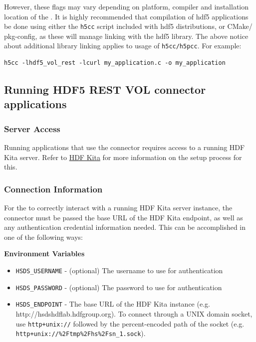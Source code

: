 \documentclass[../users_guide.tex]{subfiles}
\begin{document}
However, these flags may vary depending on platform, compiler and installation
location of the \rvc{}. It is highly recommended that compilation
of \acrshort{hdf5} \rvc{} applications be done using either the
\texttt{h5cc} script included with \acrshort{hdf5} distributions, or CMake/
pkg-config, as these will manage linking with the \acrshort{hdf5} library.
The above notice about additional library linking applies to usage of
\texttt{h5cc/h5pcc}. For example:
\begin{verbatim}
h5cc -lhdf5_vol_rest -lcurl my_application.c -o my_application
\end{verbatim}

\subsection{Running HDF5 REST VOL connector applications}
\label{running_rest_vol_apps}

\subsubsection{Server Access}

Running applications that use the \rvc{} connector requires access to a running HDF Kita
server. Refer to \href{https://www.hdfgroup.org/hdf-kita}{HDF Kita} for more information on
the setup process for this.

\subsubsection{Connection Information}

For the \rvc{} to correctly interact with a running HDF Kita server instance, the connector
must be passed the base URL of the HDF Kita endpoint, as well as any authentication credential
information needed. This can be accomplished in one of the following ways:

\textbf{Environment Variables}

\begin{itemize}
  \item \texttt{HSDS\_USERNAME} - (optional) The username to use for authentication
  \item \texttt{HSDS\_PASSWORD} - (optional) The password to use for authentication
  \item \texttt{HSDS\_ENDPOINT} - The base URL of the HDF Kita instance (e.g. http://hsdshdflab.hdfgroup.org).
    To connect through a UNIX domain socket, use \texttt{http+unix://} followed by the
    percent-encoded path of the socket (e.g. \texttt{http+unix://\%2Ftmp\%2Fhs\%2Fsn\_1.sock}).
\end{itemize}
\end{document}

